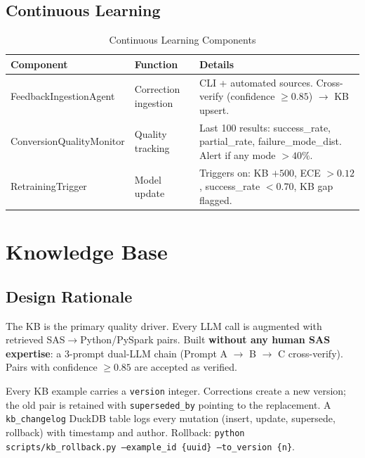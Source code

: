 \documentclass[11pt,a4paper]{article}
\begin{document}
\subsection{Continuous Learning}

\begin{table}[H]
\centering
\caption{Continuous Learning Components}
\renewcommand{\arraystretch}{1.3}
\small
\begin{tabularx}{\textwidth}{@{} l L{3.5cm} X @{}}
\toprule
\textbf{Component} & \textbf{Function} & \textbf{Details} \\
\midrule
FeedbackIngestionAgent & Correction ingestion & CLI + automated sources. Cross-verify (confidence $\geq 0.85$) $\to$ KB upsert. \\
ConversionQualityMonitor & Quality tracking & Last 100 results: success\_rate, partial\_rate, failure\_mode\_dist. Alert if any mode $> 40\%$. \\
RetrainingTrigger & Model update & Triggers on: KB $+500$, ECE $> 0.12$, success\_rate $< 0.70$, KB gap flagged. \\
\bottomrule
\end{tabularx}
\end{table}


\section{Knowledge Base}

\subsection{Design Rationale}

The KB is the primary quality driver. Every LLM call is augmented with retrieved SAS$\to$Python/PySpark pairs. Built \textbf{without any human SAS expertise}: a 3-prompt dual-LLM chain (Prompt A $\to$ B $\to$ C cross-verify). Pairs with confidence $\geq 0.85$ are accepted as verified.

\begin{infobox}[KB Versioning]
Every KB example carries a \texttt{version} integer. Corrections create a new version; the old pair is retained with \texttt{superseded\_by} pointing to the replacement. A \texttt{kb\_changelog} DuckDB table logs every mutation (insert, update, supersede, rollback) with timestamp and author. Rollback: \texttt{python scripts/kb\_rollback.py --example\_id \{uuid\} --to\_version \{n\}}.
\end{infobox}
\end{document}

